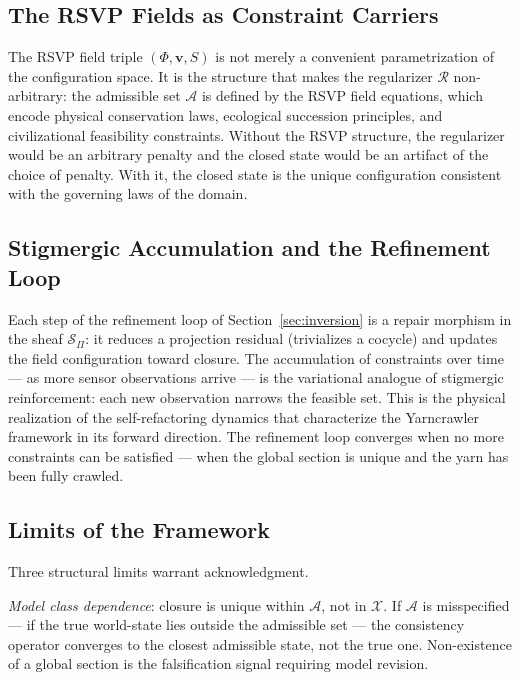 \documentclass[11pt, oneside]{article}
\begin{document}
\subsection{The RSVP Fields as Constraint Carriers}

The RSVP field triple $(\Phi, \mathbf{v}, S)$ is not merely a convenient
parametrization of the configuration space. It is the structure that makes the regularizer
$\mathcal{R}$ non-arbitrary: the admissible set $\mathcal{A}$ is defined by the RSVP
field equations, which encode physical conservation laws, ecological succession
principles, and civilizational feasibility constraints. Without the RSVP structure, the
regularizer would be an arbitrary penalty and the closed state would be an artifact of
the choice of penalty. With it, the closed state is the unique configuration consistent
with the governing laws of the domain.

\subsection{Stigmergic Accumulation and the Refinement Loop}

Each step of the refinement loop of Section~\ref{sec:inversion} is a repair morphism in
the sheaf $\mathcal{S}_\Pi$: it reduces a projection residual (trivializes a cocycle) and
updates the field configuration toward closure. The accumulation of constraints over
time --- as more sensor observations arrive --- is the variational analogue of stigmergic
reinforcement: each new observation narrows the feasible set. This is the physical
realization of the self-refactoring dynamics that characterize the Yarncrawler framework
in its forward direction. The refinement loop converges when no more constraints can be
satisfied --- when the global section is unique and the yarn has been fully crawled.

\subsection{Limits of the Framework}

Three structural limits warrant acknowledgment.

\emph{Model class dependence}: closure is unique within $\mathcal{A}$, not in $\mathcal{X}$.
If $\mathcal{A}$ is misspecified --- if the true world-state lies outside the admissible
set --- the consistency operator converges to the closest admissible state, not the true
one. Non-existence of a global section is the falsification signal requiring model
revision.
\end{document}
